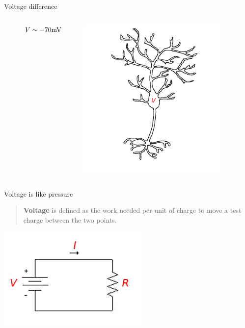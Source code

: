 \documentclass{beamer}
\newcommand{\crish}{\color{reddish}}
\newcommand{\cbla}{\color{black}}
\newcommand{\cred}{\color{red}}
\begin{document}
\begin{frame}{Voltage difference}
  \begin{columns}
        \begin{column}{0.2\textwidth}
      \end{column}
    \begin{column}{0.3\textwidth}
  $\cred V\crish\sim -70\mbox{mV}\cbla $
    \end{column}
    \begin{column}{0.3\textwidth}
    \includegraphics[height=8cm]{voltage.png}
    \end{column}
    \begin{column}{0.2\textwidth}
      \end{column}
    \end{columns}
\end{frame}

\begin{frame}{Voltage is like pressure}
  \begin{quote}
   \textbf{Voltage} is defined as the work needed per unit of charge to move a
    test charge between the two points.
  \end{quote}
\begin{center}
    \includegraphics[height=5cm]{basic_circuit.png}
\end{center}
\end{frame}
\end{document}
